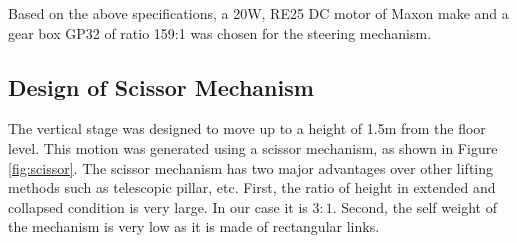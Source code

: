 Based on the above specifications, a 20W, RE25 DC motor of Maxon  make and a gear box  GP32 of ratio 159:1 was chosen for the steering mechanism. 

\subsection{Design of Scissor Mechanism}
 The vertical stage was designed to move  up to a height of 1.5m from the floor level. This motion was generated using  a scissor mechanism, as shown in Figure \ref{fig:scissor}. The scissor mechanism has two major advantages over other lifting methods such as telescopic pillar, etc.  First, the  ratio of height in extended and collapsed condition is very large. In our case it is $3:1$. Second, the self weight of the mechanism is very low as it is made of rectangular links.

